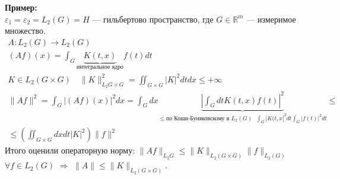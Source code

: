 \documentclass[12pt]{article}
\begin{document}
\textbf{Пример:}\\
$\varepsilon_1 = \varepsilon_2 = L_2(G) = H$ --- гильбертово пространство, где $G \in \mathbb R^m$ --- измеримое множество.
\begin{gather*}
    A : L_2(G) \to L_2(G)\\
    (Af)(x) = \int_G \underbrace{K(t, x)}_{\text{интегральное ядро}} f(t) dt\\
    K \in L_2(G \times G) \quad \|K\|^2_{L_2{G \times G}} = \iint_{G \times G} |K|^2 dt dx \le +\infty\\
    \|Af\|^2 = \int_{G} |(Af)(x)|^2 dx = \int_G dx  \underbrace{\left| \int_G dt K(t, x) f(t) \right|^2}_{\le\text{по Коши-Буняковскому в }L_2(G)\text{ }
    \int_G |K(t, x|^2 dt \int_G |f(t)|^2 dt}\le\\
    \le \left(\iint_{G \times G} dx dt |K|^2 \right)\|f\|^2
\end{gather*}
Итого оценили операторную норму: $\|Af\|_{L_2{G}} \le \|K\|_{L_2(G \times G)}\|f\|_{L_2(G)}$ $\forall f \in L_2(G)$ $\Rightarrow$ $\boxed{\|A\| \le \|K\|_{L_2(G \times G)}}$.
\end{document}
